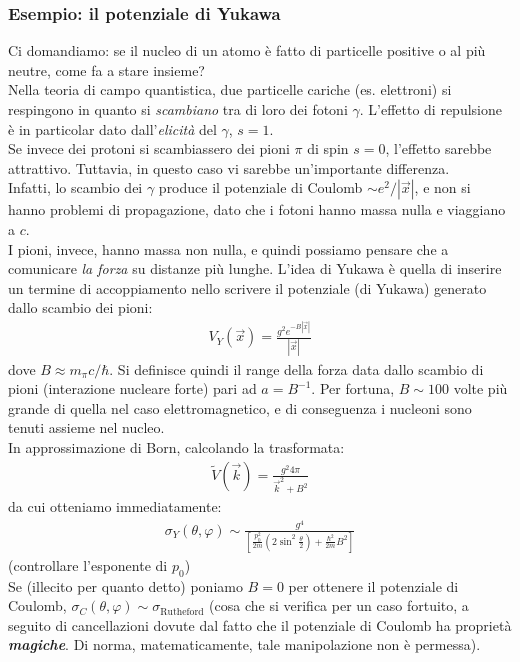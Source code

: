 \documentclass[../../FisicaTeorica.tex]{subfiles}
\begin{document}
\subsubsection{Esempio: il potenziale di Yukawa}
Ci domandiamo: se il nucleo di un atomo è fatto di particelle positive o al più neutre, come fa a stare insieme?\\
Nella teoria di campo quantistica, due particelle cariche (es. elettroni) si respingono in quanto si \textit{scambiano} tra di loro dei fotoni $\gamma$. L'effetto di repulsione è in particolar dato dall'\textit{elicità} del $\gamma$, $s=1$.\\
Se invece dei protoni si scambiassero dei pioni $\pi$ di spin $s=0$, l'effetto sarebbe attrattivo. Tuttavia, in questo caso vi sarebbe un'importante differenza.\\
Infatti, lo scambio dei $\gamma$ produce il potenziale di Coulomb $\sim e^2/|\vec{x}|$, e non si hanno problemi di propagazione, dato che i fotoni hanno massa nulla e viaggiano a $c$.\\
I pioni, invece, hanno massa non nulla, e quindi possiamo pensare che  a comunicare \textit{la forza} su distanze più lunghe. L'idea di Yukawa è quella di inserire un termine di accoppiamento nello scrivere il potenziale (di Yukawa) generato dallo scambio dei pioni:
\begin{align*}
V_Y(\vec{x})=
\frac{g^2 e^{-B|\vec{x}|}}{|\vec{x}|}
\end{align*}
dove $B \approx m_\pi c/\hbar$. Si definisce quindi il range della forza data dallo scambio di pioni (interazione nucleare forte) pari ad $a=B^{-1}$. Per fortuna, $B \sim 100$ volte più grande di quella nel caso elettromagnetico, e di conseguenza i nucleoni sono tenuti assieme nel nucleo.\\

In approssimazione di Born, calcolando la trasformata:
\begin{align*}
\tilde{V}(\vec{k}) = \frac{g^2 4\pi}{\vec{k}^2+B^2}
\end{align*}
da cui otteniamo immediatamente:
\begin{align*}
\sigma_Y(\theta,\varphi) \sim \frac{g^4}{\displaystyle
\left[\frac{p_0^2}{2m}\left( 2 \sin^2\frac{\theta}{2}\right) + \frac{\hbar^2}{2m} B^2 \right]
}
\end{align*}
(controllare l'esponente di $p_0$)\\

Se (illecito per quanto detto) poniamo $B=0$ per ottenere il potenziale di Coulomb, $\sigma_C(\theta,\varphi) \sim \sigma_{\text{Rutheford}}$ (cosa che si verifica per un caso fortuito, a seguito di cancellazioni dovute dal fatto che il potenziale di Coulomb ha proprietà \textit{\textbf{magiche}}. Di norma, matematicamente, tale manipolazione non è permessa).
\end{document}

